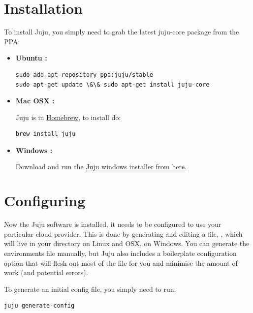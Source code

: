 \documentclass[letterpaper,10pt,english]{sphinxmanual}
\begin{document}
\chapter{Installation}
\label{index:installation}
To install Juju, you simply need to grab the latest juju-core package
from the PPA:
\begin{itemize}
\item {} 
\textbf{Ubuntu :}

\begin{Verbatim}[commandchars=\\\{\}]
sudo add-apt-repository ppa:juju/stable
sudo apt-get update \&\& sudo apt-get install juju-core
\end{Verbatim}

\item {} 
\textbf{Mac OSX :}

Juju is in \href{http://brew.sh/}{Homebrew}, to install do:

\begin{Verbatim}[commandchars=\\\{\}]
brew install juju
\end{Verbatim}

\item {} 
\textbf{Windows :}

Download and run the \href{https://launchpad.net/juju-core/1.16/1.16.2/+download/juju-setup-1.16.2-signed.exe}{Juju windows installer from here.}

\end{itemize}


\chapter{Configuring}
\label{index:configuring}
Now the Juju software is installed, it needs to be configured to use
your particular cloud provider. This is done by generating and editing
a file, , which will live in your 
directory on Linux and OSX,  on Windows. You can
generate the environments file manually, but Juju also includes a
boilerplate configuration option that will flesh out most of the file
for you and minimise the amount of work (and potential errors).

To generate an initial config file, you simply need to run:

\begin{Verbatim}[commandchars=\\\{\}]
juju generate-config
\end{Verbatim}
\end{document}
